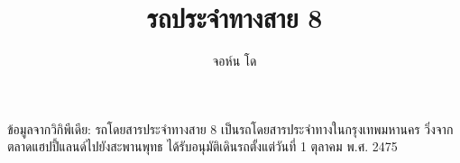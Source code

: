 \documentclass[11pt, a4paper]{report}
\title{รถประจำทางสาย 8}
\author{จอห์น โด}
\begin{document}
\maketitle

ข้อมูลจากวิกิพีเดีย: รถโดยสารประจำทางสาย 8 เป็นรถโดยสารประจำทางในกรุงเทพมหานคร
วิ่งจากตลาดแฮปปี้แลนด์ไปยังสะพานพุทธ ได้รับอนุมัติเดินรถตั้งแต่วันที่
1 ตุลาคม พ.ศ. 2475
\end{document}
